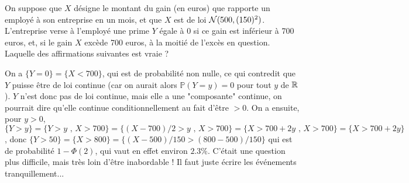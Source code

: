 \begin{question}
On suppose que $X$ désigne le montant du gain (en euros) que rapporte un employé à son entreprise en un mois, et que $X$ est de loi ${\cal N}(500,(150)^2)$. L'entreprise verse à l'employé une prime $Y$ égale à $0$ si ce gain est inférieur à 700 euros, et, si le gain $X$ excède 700 euros, à la moitié de l'excès en question.  Laquelle des affirmations suivantes est vraie ? 
\begin{answers}
\end{answers}
\begin{explanations}
On a $\{Y=0\} = \{X<700\}$, qui est de probabilité non nulle, ce qui contredit que $Y$ puisse être de loi continue (car on aurait alors $\mathbb{P}(Y=y)=0$ pour tout $y$ de $\mathbb{R}$). $Y$ n'est donc pas de loi continue, mais elle a une "composante" continue, on pourrait dire qu'elle continue conditionnellement au fait d'être $>0$. On a ensuite, pour $y >0$, $\{Y>y\} = \{Y>y \mbox{ , } X>700\} = \{ (X-700)/2 > y \mbox{ , } X>700\} = \{ X>700+2y \mbox{ , } X>700\} = \{X>700+2y\}$, donc $\{Y>50\} = \{X>800\} = \{ (X-500)/150 > (800-500)/150 \}$ qui est de probabilité $1-\Phi(2)$, qui vaut en effet environ $2.3\%$.  C'était une question plus difficile, mais très loin d'être inabordable ! Il faut juste écrire les événements tranquillement... 
\end{explanations}
\end{question}

